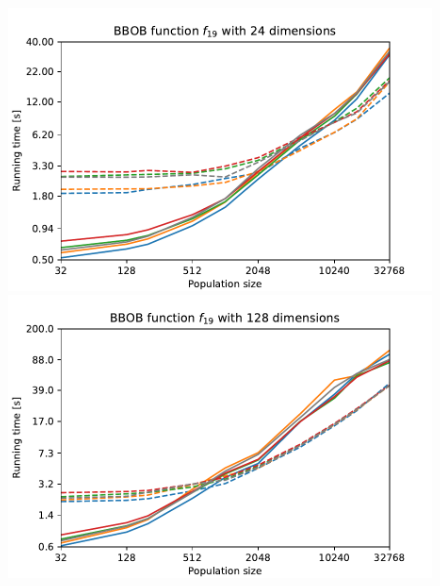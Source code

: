 \begin{figure}[ht!]
    \begin{minipage}[t]{0.32\textwidth}
        \centering
        \includegraphics[width=\textwidth]{img/runs/time_es_crossover_fn19_24d.pdf}
    \end{minipage}
    \hfill
    \begin{minipage}[t]{0.32\textwidth}
        \centering
        \includegraphics[width=\textwidth]{img/runs/time_es_crossover_fn19_128d.pdf}
    \end{minipage}
    \hfill
    \begin{minipage}[t]{0.32\textwidth}
        \centering

\end{minipage}
\end{figure}
